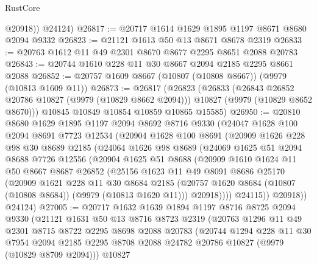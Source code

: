 \begin{lexlean}{RustCore}
\begin{coremodule}
          @20918))
      @24124)
@26817 := @20717 @1614 @1629 @1895 @1197 @8671 @8680 @2094 @9332
@26823 := @21121 @1613 @50 @13 @8671 @8678 @2319
@26833 := @20763 @1612 @11 @49 @2301 @8670 @8677 @2295 @8651 @2088 @20783
@26843 := @20744 @1610 @228 @11 @30 @8667 @2094 @2185 @2295 @8661 @2088
@26852 := @20757 @1609 @8667 (@10807 (@10808 @8667)) (@9979 (@10813 @1609 @11))
@26873 := @26817
    (@26823
      (@26833
        (@26843 @26852 @20786 @10827 (@9979 (@10829 @8662 @2094)))
        @10827
        (@9979 (@10829 @8652 @8670)))
      @10845
      @10849
      @10854
      @10859
      @10865
      @15585)
@26950 := @20810
    @8680
    @1629
    @1895
    @1197
    @2094
    @8692
    @8716
    @9330
    (@24047
      @1628
      @100
      @2094
      @8691
      @7723
      @12534
      (@20904
        @1628
        @100
        @8691
        (@20909
          @1626
          @228
          @98
          @30
          @8689
          @2185
          (@24064
            @1626
            @98
            @8689
            (@24069
              @1625
              @51
              @2094
              @8688
              @7726
              @12556
              (@20904
                @1625
                @51
                @8688
                (@20909
                  @1610
                  @1624
                  @11
                  @50
                  @8667
                  @8687
                  @26852
                  (@25156
                    @1623
                    @11
                    @49
                    @8091
                    @8686
                    @25170
                    (@20909
                      @1621
                      @228
                      @11
                      @30
                      @8684
                      @2185
                      (@20757 @1620 @8684 (@10807 (@10808 @8684)) (@9979 (@10813 @1620 @11)))
                      @20918))))
              @24115))
          @20918))
      @24124)
@27005 := @20717
    @1632
    @1639
    @1894
    @1197
    @8716
    @8725
    @2094
    @9330
    (@21121
      @1631
      @50
      @13
      @8716
      @8723
      @2319
      (@20763
        @1296
        @11
        @49
        @2301
        @8715
        @8722
        @2295
        @8698
        @2088
        @20783
        (@20744
          @1294
          @228
          @11
          @30
          @7954
          @2094
          @2185
          @2295
          @8708
          @2088
          @24782
          @20786
          @10827
          (@9979 (@10829 @8709 @2094)))
        @10827

\end{coremodule}
\end{lexlean}
